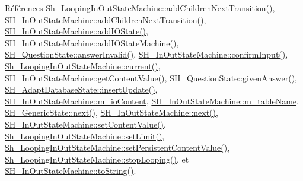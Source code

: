 Références \hyperlink{classSh__LoopingInOutStateMachine_acfd8d0711c793b13c759f6c50be6a315}{Sh\-\_\-\-Looping\-In\-Out\-State\-Machine\-::add\-Children\-Next\-Transition()}, \hyperlink{classSH__InOutStateMachine_a689e5513ef6ef3fc1598efacd413372e}{S\-H\-\_\-\-In\-Out\-State\-Machine\-::add\-Children\-Next\-Transition()}, \hyperlink{classSH__InOutStateMachine_ad6b778d052f741daee720c047059ce0e}{S\-H\-\_\-\-In\-Out\-State\-Machine\-::add\-I\-O\-State()}, \hyperlink{classSH__InOutStateMachine_a56954869252c7f1980abf37df9919b5e}{S\-H\-\_\-\-In\-Out\-State\-Machine\-::add\-I\-O\-State\-Machine()}, \hyperlink{classSH__QuestionState_a3348a8a683130678ac87a10ba2a25486}{S\-H\-\_\-\-Question\-State\-::answer\-Invalid()}, \hyperlink{classSH__InOutStateMachine_a0fb4c4d63ccb19df48f1e060d02d8ae3}{S\-H\-\_\-\-In\-Out\-State\-Machine\-::confirm\-Input()}, \hyperlink{classSh__LoopingInOutStateMachine_a1b4661f92617e9cdbacc1be354f2a54a}{Sh\-\_\-\-Looping\-In\-Out\-State\-Machine\-::current()}, \hyperlink{classSH__InOutStateMachine_a2cdd914f1e597ac52d021106eec75c89}{S\-H\-\_\-\-In\-Out\-State\-Machine\-::get\-Content\-Value()}, \hyperlink{classSH__QuestionState_abde97c61175be95358ece622fd16593e}{S\-H\-\_\-\-Question\-State\-::given\-Answer()}, \hyperlink{classSH__AdaptDatabaseState_ab010e64da052db416328d3bcb9ca01d4}{S\-H\-\_\-\-Adapt\-Database\-State\-::insert\-Update()}, \hyperlink{classSH__InOutStateMachine_a661a1c7bd3b1086b3b5cd60ca957ecbd}{S\-H\-\_\-\-In\-Out\-State\-Machine\-::m\-\_\-io\-Content}, \hyperlink{classSH__InOutStateMachine_acc0f5d5133af2dcca30939f53ec8837b}{S\-H\-\_\-\-In\-Out\-State\-Machine\-::m\-\_\-table\-Name}, \hyperlink{classSH__GenericState_a030e67a872956135c52e6876d960a7b5}{S\-H\-\_\-\-Generic\-State\-::next()}, \hyperlink{classSH__InOutStateMachine_aa9ee51efe0e17dcf5366c8a97b523892}{S\-H\-\_\-\-In\-Out\-State\-Machine\-::next()}, \hyperlink{classSH__InOutStateMachine_aa2766b7a7ba39c35a10df7fc0c151b4f}{S\-H\-\_\-\-In\-Out\-State\-Machine\-::set\-Content\-Value()}, \hyperlink{classSh__LoopingInOutStateMachine_ab5e9ac94cbd9a47a45dcb50e777c398b}{Sh\-\_\-\-Looping\-In\-Out\-State\-Machine\-::set\-Limit()}, \hyperlink{classSh__LoopingInOutStateMachine_aa7d8c9cc870607ed9ef75319bff88500}{Sh\-\_\-\-Looping\-In\-Out\-State\-Machine\-::set\-Persistent\-Content\-Value()}, \hyperlink{classSh__LoopingInOutStateMachine_a8788fa9e4c3149bcf7554e2a2b960c51}{Sh\-\_\-\-Looping\-In\-Out\-State\-Machine\-::stop\-Looping()}, et \hyperlink{classSH__InOutStateMachine_a60ecd7de03d948e2d1e9cbedb5c3e5fa}{S\-H\-\_\-\-In\-Out\-State\-Machine\-::to\-String()}.


